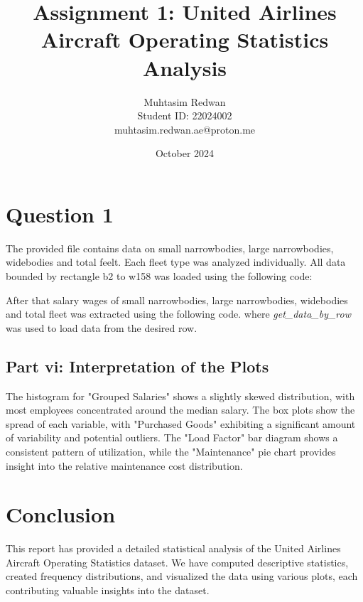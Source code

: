 \documentclass[a4paper,12pt]{article}
\title{Assignment 1: United Airlines Aircraft Operating Statistics Analysis}
\author{Muhtasim Redwan \\ Student ID: 22024002 \\ muhtasim.redwan.ae@proton.me}
\date{October 2024}
\begin{document}
\maketitle




\section{Question 1}
The provided file contains data on small narrowbodies, large narrowbodies, widebodies and total feelt. Each fleet
type was analyzed individually. All data bounded by rectangle b2 to w158 was loaded using the following code:


After that salary wages of small narrowbodies, large narrowbodies, widebodies and total fleet was extracted using the following code. where \textit{get\_data\_by\_row} was used to load data from the desired row.








\subsection{Part vi: Interpretation of the Plots}
The histogram for "Grouped Salaries" shows a slightly skewed distribution, with most employees concentrated around the median salary. The box plots show the spread of each variable, with "Purchased Goods" exhibiting a significant amount of variability and potential outliers. The "Load Factor" bar diagram shows a consistent pattern of utilization, while the "Maintenance" pie chart provides insight into the relative maintenance cost distribution.

\section*{Conclusion}
This report has provided a detailed statistical analysis of the United Airlines Aircraft Operating Statistics dataset. We have computed descriptive statistics, created frequency distributions, and visualized the data using various plots, each contributing valuable insights into the dataset.
\end{document}
